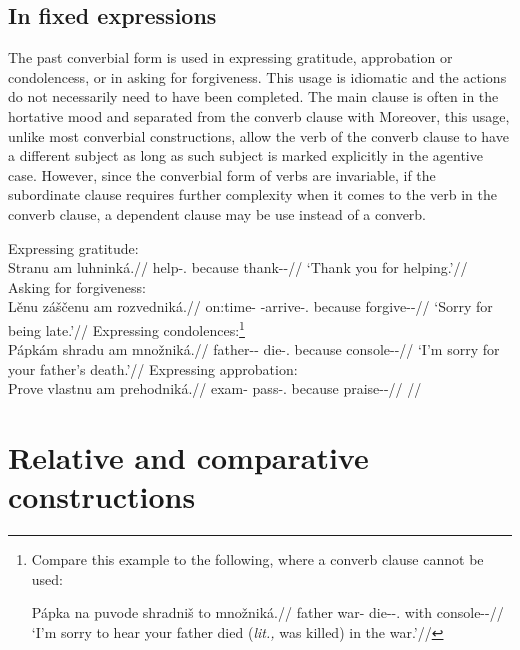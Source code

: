 \subsection{In fixed expressions}

The past converbial form is used in expressing gratitude, approbation or
condolencess, or in asking for forgiveness. This usage is idiomatic and the
actions do not necessarily need to have been completed. The main clause is often
in the hortative mood and separated from the converb
clause with  Moreover, this usage, unlike most converbial
constructions, allow the verb of the converb clause to have a different subject
as long as such subject is marked explicitly in the agentive case. However,
since the converbial form of verbs are invariable, if the subordinate clause
requires further complexity when it comes to the verb in the converb clause, a
dependent  clause may be use instead of a converb.

\pex
\a Expressing gratitude:\\
\begingl
\gla Stranu am luhninká.//
\glb help-\Cv{}.\Pf{} because thank-\Pv{}-\Hort{}//
\glft `Thank you for helping.'//
\endgl
\a Asking for forgiveness:\\
\begingl
\gla Lěnu záščenu am rozvedniká.//
\glb on:time-\Ins{} \Neg{}-arrive-\Cv{}.\Pf{} because forgive-\Pv{}-\Hort{}//
\glft `Sorry for being late.'//
\endgl
\a Expressing condolences:\footnote{Compare this example to the following, where
a converb clause cannot be used:

\ex[lingstyle=fnex,belowexskip=-1em]
\begingl
\gla Pápka na puvode shradniš to množniká.//
\glb father \Loc{} war-\Acc{} die-\Pv{}-\Subj.\Pf{} \Rz{} with console-\Pv{}-\Hort{}//
\glft `I'm sorry to hear your father died (\emph{lit.,} was killed) in the war.'//
\endgl\xe}\\
\begingl
\gla Pápkám shradu am množniká.//
\glb father-\Dim{}-\Agt{} die-\Cv{}.\Pf{} because console-\Pv{}-\Hort{}//
\glft `I'm sorry for your father's death.'//
\endgl
\a Expressing approbation:\\
\begingl
\gla Prove vlastnu am prehodniká.//
\glb exam-\Acc{} pass-\Cv{}.\Pf{} because praise-\Pv{}-\Hort{}//
\glft {}//
\endgl
\xe

\section{Relative and comparative
constructions}\label{relativecomparative}

